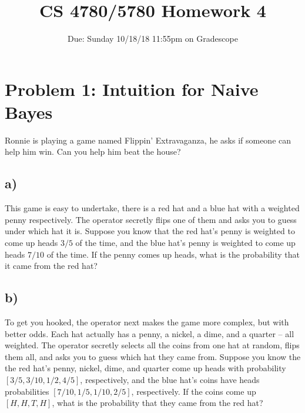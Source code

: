 \documentclass[a4paper]{article}
\title{CS 4780/5780 Homework 4\vspace{-10pt}}
\author{Due: Sunday 10/18/18 11:55pm on Gradescope}
\date{\vspace{-20pt}}
\begin{document}
\maketitle

\section*{Problem 1: Intuition for Naive Bayes}
Ronnie is playing a game named Flippin' Extravaganza, he asks if someone can help him win. Can you help him beat the house?
\subsection*{a)}
This game is easy to undertake, there is a red hat and a blue hat with a weighted penny respectively. The operator secretly flips one of them and asks you to guess under which hat it is. Suppose you know that the red hat's penny is weighted to come up heads $3/5$ of the time, and the blue hat's penny is weighted to come up heads $7/10$ of the time. If the penny comes up heads, what is the probability that it came from the red hat?
\subsection*{b)}
To get you hooked, the operator next makes the game more complex, but with better odds. Each hat actually has a penny, a nickel, a dime, and a quarter -- all weighted. The operator secretly selects all the coins from one hat at random, flips them all, and asks you to guess which hat they came from. Suppose you know the the red hat's penny, nickel, dime, and quarter come up heads with probability $[3/5, 3/10, 1/2, 4/5]$, respectively, and the blue hat's coins have heads probabilities $[7/10, 1/5, 1/10, 2/5]$, respectively. If the coins come up $[H,H,T,H]$, what is the probability that they came from the red hat?
\end{document}
